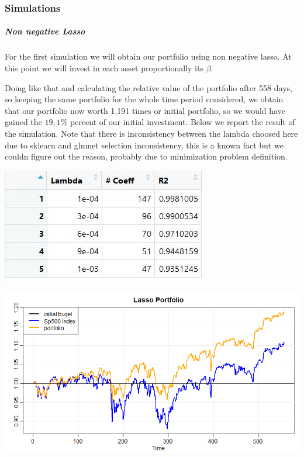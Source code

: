 \documentclass{article}%
\begin{document}
\subsubsection{Simulations}

\subparagraph{Non negative Lasso}
For the first simulation we will obtain our portfolio using non negative lasso. At this point we will invest in each asset proportionally its $\beta$. 

Doing like that and calculating the relative value of the portfolio after 558 days, so keeping the same portfolio for the whole time period considered, we obtain that our portfolio now worth  1.191 times or initial portfolio, so we would have gained the $19,1\%$ percent of our initial investment. Below we report the result of the simulation.
Note that there is inconsistency between the lambda choosed here due to sklearn and glmnet selection inconsistency, this is a known fact but we couldn figure out the reason, probably due to minimization problem definition.
\\
\begin{center}
\includegraphics[scale=0.75]{tablasso}
\\

\end{center}


\includegraphics[scale=0.60]{lassoportfolio}
\\
\end{document}
